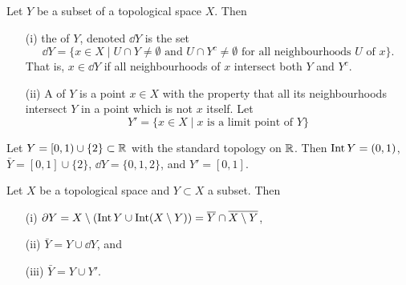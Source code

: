 \begin{defn}
  Let $Y$ be a subset of a topological space $X$. Then
  \begin{enumerate}
    \item[(i)] the  of $Y$, denoted $\dd Y$ is the set
      \[
        \dd Y = \{ x \in X \mid \text{$U \cap Y \not= \emptyset$ and $U \cap Y^c \not= \emptyset$ for all neighbourhoods $U$ of $x$}\}.
      \]
      That is, $x \in \dd Y$ if all neighbourhoods of $x$ intersect both $Y$ and $Y^c$.
    \item[(ii)] A  of $Y$ is a point $x \in X$ with the property that all its neighbourhoods intersect $Y$ in a point which is not $x$ itself. Let
    \[
      Y' = \{x \in X \mid \text{$x$ is a limit point of $Y$} \}
    \]
  \end{enumerate}
\end{defn}
\begin{example}
  Let $Y = [0,1) \cup \{2\} \subset \mathbb{R}$ with the standard topology on $\mathbb{R}$. Then $\operatorname{Int} Y = (0,1)$, $\bar{Y} = [0,1] \cup \{2\}$, $\dd Y = \{0,1,2\}$, and $Y' = [0,1]$.
\end{example}
\begin{thm}
  Let $X$ be a topological space and $Y \subset X$ a subset. Then
  \begin{enumerate}
    \item[(i)]  $\partial Y = X \setminus (\operatorname{Int} Y \cup \operatorname{Int} (X \setminus Y)) = \overline Y \cap \overline{X \setminus Y}$,
    \item[(ii)] $\bar{Y} = Y \cup \dd Y$, and
    \item[(iii)] $\bar{Y} = Y \cup Y'$.
  \end{enumerate}
\end{thm}
